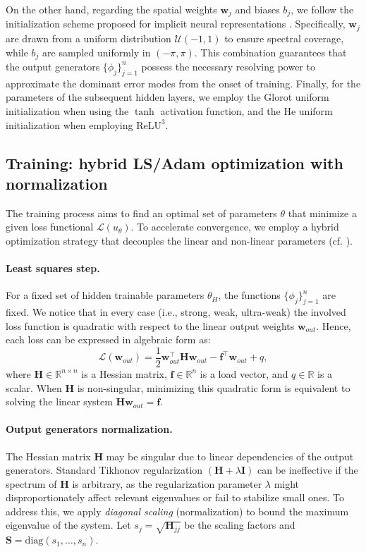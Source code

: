 \documentclass{article}
\theoremstyle{definition}
\begin{document}
On the other hand, regarding the spatial weights $\mathbf{w}_j$ and biases $b_j$, we follow the initialization scheme proposed for implicit neural representations \cite{sitzmann2020implicit}. Specifically, $\mathbf{w}_j$ are drawn from a uniform distribution $\mathcal{U}(-1,1)$ to ensure spectral coverage, while $b_j$ are sampled uniformly in $(-\pi, \pi)$. This combination guarantees that the output generators $\{\phi_j\}_{j=1}^n$ possess the necessary resolving power to approximate the dominant error modes from the onset of training. Finally, for the parameters of the subsequent hidden layers, we employ the Glorot uniform initialization when using the $\tanh$ activation function, and the He uniform initialization when employing $\text{ReLU}^3$.

\subsection{Training: hybrid LS/Adam optimization with normalization}

The training process aims to find an optimal set of parameters $\theta$ that minimize a given loss functional $\mathcal{L}(u_\theta)$.
To accelerate convergence, we employ a hybrid optimization strategy that decouples the linear and non-linear parameters (cf. \cite{uriarte2025vpinnsLS, Cyr2019RobustTA}).

\paragraph{Least squares step.}
For a fixed set of hidden trainable parameters $\theta_H$, the functions $\{\phi_j\}_{j=1}^n$ are fixed.
We notice that in every case (i.e., strong, weak, ultra-weak) the involved loss function is quadratic with respect to the linear output weights $\mathbf{w}_{out}$.
Hence, each loss can be expressed in algebraic form as:
\begin{equation}
    \mathcal{L}(\mathbf{w}_{out}) = \frac{1}{2} \mathbf{w}_{out}^\top \mathbf{H} \mathbf{w}_{out} - \mathbf{f}^\top \mathbf{w}_{out} + q,
\end{equation}
where $\mathbf{H} \in \mathbb{R}^{n \times n}$ is a Hessian matrix, $\mathbf{f} \in \mathbb{R}^n$ is a load vector, and $q \in \mathbb{R}$ is a scalar. When $\mathbf{H}$ is non-singular, minimizing this quadratic form is equivalent to solving the linear system $\mathbf{H} \mathbf{w}_{out} = \mathbf{f}$.

\paragraph{Output generators normalization.}
The Hessian matrix $\mathbf{H}$ may be singular due to linear dependencies of the output generators.
Standard Tikhonov regularization $(\mathbf{H} + \lambda \mathbf{I})$ can be ineffective if the spectrum of $\mathbf{H}$ is arbitrary, as the regularization parameter $\lambda$ might disproportionately affect relevant eigenvalues or fail to stabilize small ones.
To address this, we apply \textit{diagonal scaling} (normalization) to bound the maximum eigenvalue of the system.
Let $s_j = \sqrt{\mathbf{H}_{jj}}$ be the scaling factors and $\mathbf{S} = \text{diag}(s_1, \dots, s_n)$.
\end{document}
